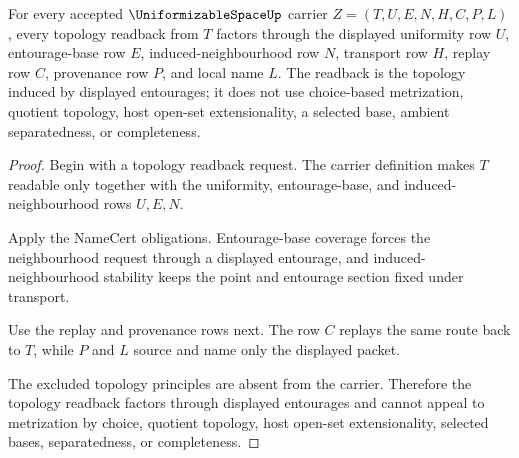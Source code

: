 \begin{theorem}
\label{thm:uniformizable-space-entourage-topology-scope}
For every accepted $\UniformizableSpaceUp$ carrier $Z=(T,U,E,N,H,C,P,L)$, every topology readback from $T$ factors through the displayed uniformity row $U$, entourage-base row $E$, induced-neighbourhood row $N$, transport row $H$, replay row $C$, provenance row $P$, and local name $L$. The readback is the topology induced by displayed entourages; it does not use choice-based metrization, quotient topology, host open-set extensionality, a selected base, ambient separatedness, or completeness.
\end{theorem}
\begin{proof}
Begin with a topology readback request. The carrier definition makes $T$ readable only together with the uniformity, entourage-base, and induced-neighbourhood rows $U,E,N$.

Apply the NameCert obligations. Entourage-base coverage forces the neighbourhood request through a displayed entourage, and induced-neighbourhood stability keeps the point and entourage section fixed under transport.

Use the replay and provenance rows next. The row $C$ replays the same route back to $T$, while $P$ and $L$ source and name only the displayed packet.

The excluded topology principles are absent from the carrier. Therefore the topology readback factors through displayed entourages and cannot appeal to metrization by choice, quotient topology, host open-set extensionality, selected bases, separatedness, or completeness.
\end{proof}




